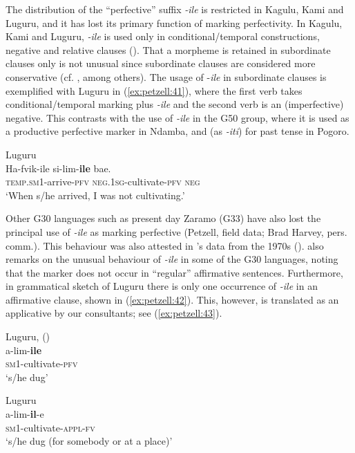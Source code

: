 \documentclass[output=paper,
            colorlinks, citecolor=brown
            ,draftmode
		  ]{langscibook}
\begin{document}
The distribution of the “perfective” suffix \textit{{}-ile} is restricted in Kagulu, Kami and Luguru, and it has lost its primary function of marking perfectivity. In Kagulu, Kami and Luguru, \textit{{}-ile} is used only in conditional/temporal constructions, negative and relative clauses (\cites[126]{Petzell2008}[581--582, 588]{PetzellAunio2019}). That a morpheme is retained in subordinate clauses only is not unusual since subordinate clauses are considered more conservative (cf. \citealt{Bybee2002}, among others). The usage of -\textit{ile} in subordinate clauses is exemplified with Luguru in (\ref{ex:petzell:41}), where the first verb takes conditional/temporal marking plus \textit{{}-ile} and the second verb is an (imperfective) negative. This contrasts with the use of \textit{{}-ile} in the G50 group, where it is used as a productive perfective marker in Ndamba, and (as \textit{{}-iti}) for past tense in Pogoro.


\ea\label{ex:petzell:41}Luguru\\
\gll Ha-fvik-ile             si-lim-\textbf{ile}               bae. \\
\textsc{temp.sm}1-arrive-\textsc{{pfv}}    \textsc{neg}\textsc{.1sg}-cultivate-\textsc{pfv}    \textsc{neg}\\
\glt `When s/he arrived, I was not cultivating.’
\z


Other G30 languages such as present day Zaramo (G33) have also lost the principal use of \textit{{}-ile} as marking perfective (Petzell, field data; Brad Harvey, pers. comm.). This behaviour was also attested in \citeauthor{Nurse2008}'s data from the 1970s (\citeyear[Appendix 1, pp.169--170]{Nurse2008}). \citet[49]{Guthrie1948} also remarks on the unusual behaviour of \textit{{}-ile} in some of the G30 languages, noting that the marker does not occur in “regular” affirmative sentences. Furthermore, in  grammatical sketch of Luguru there is only one occurrence of \textit{{}-ile} in an affirmative clause, shown in  (\ref{ex:petzell:42}). This, however, is translated as an applicative by our consultants; see  (\ref{ex:petzell:43}).


\ea\label{ex:petzell:42}Luguru, (\citealt[81]{Mkude1974})\\
\gll a-lim-\textbf{ile} \\
\textsc{sm}1-cultivate-\textsc{{pfv}}\\
\glt `s/he dug'                                   


\ex\label{ex:petzell:43}Luguru\\
\gll a-lim-\textbf{il}{}-e  \\
\textsc{sm}1-cultivate-\textsc{{appl-}fv}\\
\glt `s/he dug (for somebody or at a place)’
\z
\end{document}
